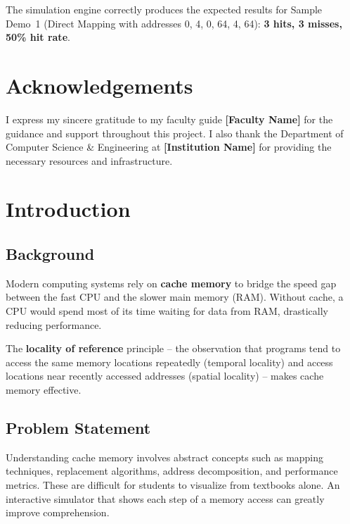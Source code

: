 \documentclass[12pt,a4paper]{report}
\begin{document}
The simulation engine correctly produces the expected results for Sample Demo~1 (Direct
Mapping with addresses 0, 4, 0, 64, 4, 64): \textbf{3 hits, 3 misses, 50\% hit rate}.

\chapter*{Acknowledgements}
I express my sincere gratitude to my faculty guide \textbf{[Faculty Name]} for the
guidance and support throughout this project. I also thank the Department of
Computer Science \& Engineering at \textbf{[Institution Name]} for providing the
necessary resources and infrastructure.

\tableofcontents
\listoffigures
\listoftables

\chapter{Introduction}

\section{Background}
Modern computing systems rely on \textbf{cache memory} to bridge the speed gap between
the fast CPU and the slower main memory (RAM). Without cache, a CPU would spend most
of its time waiting for data from RAM, drastically reducing performance.

The \textbf{locality of reference} principle -- the observation that programs tend to
access the same memory locations repeatedly (temporal locality) and access locations
near recently accessed addresses (spatial locality) -- makes cache memory effective.

\section{Problem Statement}
Understanding cache memory involves abstract concepts such as mapping techniques,
replacement algorithms, address decomposition, and performance metrics. These are
difficult for students to visualize from textbooks alone. An interactive simulator
that shows each step of a memory access can greatly improve comprehension.
\end{document}
